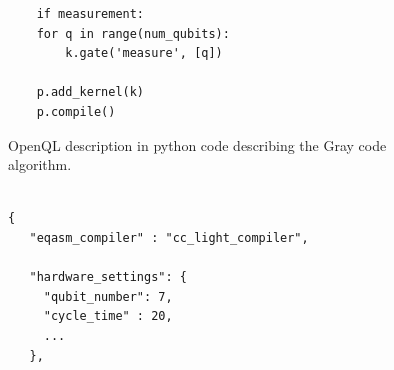 \begin{itemize}
\begin{figure}
\begin{minipage}{\textwidth}
\begin{verbatim}
    if measurement:
	for q in range(num_qubits):
	    k.gate('measure', [q])

    p.add_kernel(k)
    p.compile()

\end{verbatim}

\caption{OpenQL description in python code describing the Gray code algorithm.}
\label{code:openql_gray_code}
\end{minipage}
\end{figure}

\begin{figure}
\centering
\begin{minipage}{\textwidth}

\begin{verbatim}

{
   "eqasm_compiler" : "cc_light_compiler",

   "hardware_settings": {
	 "qubit_number": 7,
	 "cycle_time" : 20,  
     ...
   },


\end{verbatim}
\end{minipage}
\end{figure}
\end{itemize}
